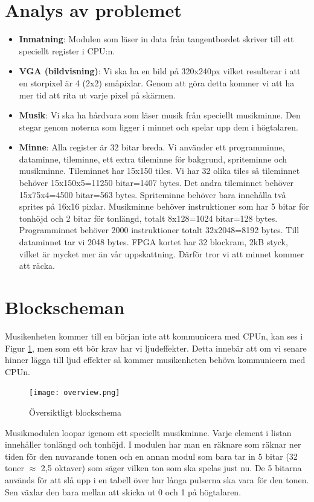 \documentclass[a4paper,titlepage]{article}
\begin{document}
\section{Analys av problemet}
\begin{itemize}
	\item \textbf{Inmatning}: Modulen som läser in data från tangentbordet
		skriver till ett speciellt register i CPU:n.
	\item \textbf{VGA (bildvisning)}: Vi ska ha en bild på 320x240px vilket
		resulterar i att en storpixel är 4 (2x2) småpixlar. Genom att göra
		detta kommer vi att ha mer tid att rita ut varje pixel på skärmen. 
	\item \textbf{Musik}: Vi ska ha hårdvara som läser musik från speciellt
		musikminne. Den stegar genom noterna som ligger i minnet och spelar upp
		dem i högtalaren.
    \item \textbf{Minne}: Alla register är 32 bitar breda. Vi använder ett 
        programminne, dataminne, tileminne, ett extra tileminne för bakgrund,
        spriteminne och musikminne. Tileminnet har 15x150 tiles. Vi har 32
        olika tiles så tileminnet behöver 15x150x5=11250 bitar=1407 bytes. Det
        andra tileminnet behöver 15x75x4=4500 bitar=563 bytes. Spriteminne
        behöver bara innehålla två sprites på 16x16 pixlar. Musikminne behöver
        instruktioner som har 5 bitar för tonhöjd och 2 bitar för tonlängd,
        totalt 8x128=1024 bitar=128 bytes. Programminnet behöver 2000 
        instruktioner totalt 32x2048=8192 bytes. Till dataminnet tar vi 2048
        bytes. FPGA kortet har 32 blockram, 2kB styck, vilket är mycket mer än
        vår uppskattning. Därför tror vi att minnet kommer att räcka.

\end{itemize}
\newpage
\section{Blockscheman}
    Musikenheten kommer till en början inte att kommunicera med CPUn, kan ses i
    Figur \ref{overviewscheme}, men som ett bör krav har vi ljudeffekter. Detta 
    innebär att om vi senare hinner lägga till ljud effekter så kommer
    musikenheten behöva kommunicera med CPUn.
\begin{figure}[h!]\label{overviewscheme}
	\centering
	\texttt{[image: overview.png]}
	\caption{Översiktligt blockschema}
\end{figure}

Musikmodulen loopar igenom ett speciellt musikminne. Varje element i listan
innehåller tonlängd och tonhöjd. I modulen har man en räknare som räknar ner
tiden för den nuvarande tonen och en annan modul som bara tar in 5 bitar (32
toner $\approx$ 2,5 oktaver) som säger vilken ton som ska spelas just nu. De 5
bitarna används för att slå upp i en tabell över hur långa pulserna ska vara för
den tonen. Sen växlar den bara mellan att skicka ut 0 och 1 på högtalaren.
\end{document}
